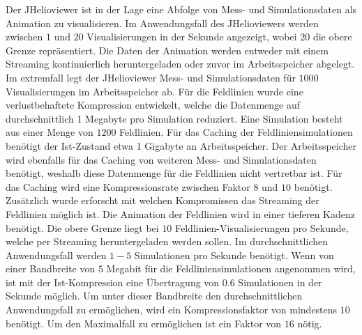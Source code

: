 Der JHelioviewer ist in der Lage eine Abfolge von Mess- und Simulationsdaten als Animation zu visualisieren. Im Anwendungsfall des JHelioviewers werden zwischen $1$ und $20$ Visualisierungen in der Sekunde angezeigt, wobei $20$ die obere Grenze repräsentiert. Die Daten der Animation werden entweder mit einem Streaming kontinuierlich heruntergeladen oder zuvor im Arbeitsspeicher abgelegt. Im extremfall legt der JHelioviewer Mess- und Simulationsdaten für $1000$ Visualisierungen im Arbeitsspeicher ab. Für die Feldlinien wurde eine verlustbehaftete Kompression entwickelt, welche die Datenmenge auf durchschnittlich 1 Megabyte pro Simulation reduziert. Eine Simulation besteht aus einer Menge von $1200$ Feldlinien. Für das Caching der Feldliniensimulationen benötigt der Ist-Zustand etwa 1 Gigabyte an Arbeitsspeicher. Der Arbeitsspeicher wird ebenfalls für das Caching von weiteren Mess- und Simulationsdaten benötigt, weshalb diese Datenmenge für die Feldlinien nicht vertretbar ist. Für das Caching wird eine Kompressionsrate zwischen Faktor $8$ und $10$ benötigt. Zusätzlich wurde erforscht mit welchen Kompromissen das Streaming der Feldlinien möglich ist. Die Animation der Feldlinien wird in einer tieferen Kadenz benötigt. Die obere Grenze liegt bei $10$ Feldlinien-Visualisierungen pro Sekunde, welche per Streaming heruntergeladen werden sollen. Im durchschnittlichen Anwendungsfall werden $1-5$ Simulationen pro Sekunde benötigt. Wenn von einer Bandbreite von $5$ Megabit für die Feldliniensimulationen angenommen wird, ist mit der Ist-Kompression eine Übertragung von $0.6$ Simulationen in der Sekunde möglich. Um unter dieser Bandbreite den durchschnittlichen Anwendungsfall zu ermöglichen, wird ein Kompressionsfaktor von mindestens $10$ benötigt. Um den Maximalfall zu ermöglichen ist ein Faktor von $16$ nötig.

